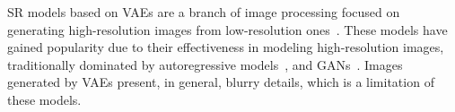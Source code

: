 SR models based on VAEs are a branch of
image processing focused on generating high-resolution images from
low-resolution ones~\citep{appati2023deep, liu2020unsupervised,
gatopoulos2020super, hyun2020varsr}. 
These models have gained popularity due to their
effectiveness in modeling high-resolution images, traditionally dominated by
autoregressive models~\citep{li2001new,joshi2005learning}, 
and GANs~\citep{chira2022image}.
Images generated by VAEs present, in general, blurry details, which is a
limitation of these models. 


